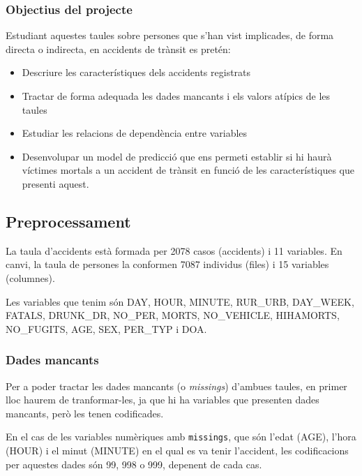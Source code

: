 \documentclass[12pt,longbibliography]{article}
\theoremstyle{definition}
\theoremstyle{remark}
\begin{document}
\subsubsection{Objectius del projecte}

Estudiant aquestes taules sobre persones que s'han vist implicades, de forma directa o indirecta, en accidents de trànsit es pretén:

\begin{itemize}

\item Descriure les característiques dels accidents registrats

\item Tractar de forma adequada les dades mancants i els valors atípics de les taules

\item Estudiar les relacions de dependència entre variables

\item Desenvolupar un model de predicció que ens permeti establir si hi haurà víctimes mortals a un accident de trànsit en funció de les característiques que presenti aquest.

\end{itemize}


\subsection{Preprocessament}

La taula d'accidents està formada per 2078 casos (accidents) i 11 variables. En canvi, la taula de persones la conformen 7087 individus (files) i 15 variables (columnes).


Les variables que tenim són DAY, HOUR, MINUTE, RUR\_URB, DAY\_WEEK, FATALS, DRUNK\_DR, NO\_PER, MORTS, NO\_VEHICLE, HIHAMORTS, NO\_FUGITS, AGE, SEX, PER\_TYP i DOA.

\subsubsection{Dades mancants}

Per a poder tractar les dades mancants (o \textit{missings}) d'ambues taules, en primer lloc haurem de tranformar-les, ja que hi ha variables que presenten dades mancants, però les tenen codificades.

En el cas de les variables numèriques amb \texttt{missings}, que són l'edat (AGE), l'hora (HOUR) i el minut (MINUTE) en el qual es va tenir l'accident, les codificacions per aquestes dades són 99, 998 o 999, depenent de cada cas.
\end{document}
